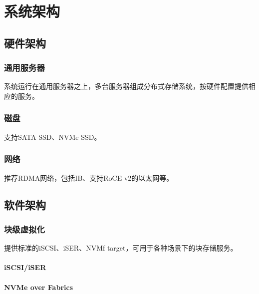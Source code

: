 \chapter{系统架构}

\section{硬件架构}

\subsection{通用服务器}

系统运行在通用服务器之上，多台服务器组成分布式存储系统，按硬件配置提供相应的服务。

\subsection{磁盘}

支持SATA SSD、NVMe SSD。

\subsection{网络}

推荐RDMA网络，包括IB、支持RoCE v2的以太网等。

\section{软件架构}



\subsection{块级虚拟化}

提供标准的iSCSI、iSER、NVMf target，可用于各种场景下的块存储服务。

\subsubsection{iSCSI/iSER}


\subsubsection{NVMe over Fabrics}

